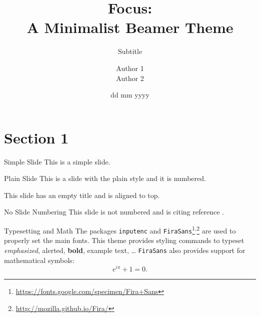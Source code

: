 \documentclass[aspectratio=169]{beamer}
\title{Focus: \\ A Minimalist Beamer Theme}
\subtitle{Subtitle}
\author{Author 1 \\ Author 2}
\institute{Institute Name \\ Institute Address}
\date{dd mm yyyy}
\begin{document}

\begin{frame}
	\maketitle %
\end{frame}


\section{Section 1} %


\begin{frame}{Simple Slide}
	This is a simple slide.
\end{frame}


\begin{frame}[plain]{Plain Slide}
	This is a slide with the plain style and it is numbered.
\end{frame}


\begin{frame}[t]
	This slide has an empty title and is aligned to top.
\end{frame}


\begin{frame}[noframenumbering]{No Slide Numbering}
	This slide is not numbered and is citing reference \cite{knuth74}.
\end{frame}


\begin{frame}{Typesetting and Math}
	The packages \texttt{inputenc} and \texttt{FiraSans}\footnote{\url{https://fonts.google.com/specimen/Fira+Sans}}\textsuperscript{,}\footnote{\url{http://mozilla.github.io/Fira/}} are used to properly set the main fonts.
	\vfill
	This theme provides styling commands to typeset \emph{emphasized}, \alert{alerted}, \textbf{bold}, \textcolor{example}{example text}, \dots
	\vfill
	\texttt{FiraSans} also provides support for mathematical symbols:
	\begin{equation*}
		e^{i\pi} + 1 = 0.
	\end{equation*}
\end{frame}
\end{document}
